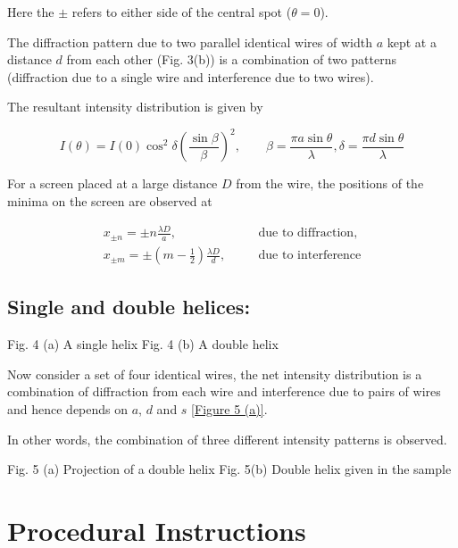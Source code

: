Here the $\pm$ refers to either side of the central spot ($\theta = 0$).

The diffraction pattern due to two parallel identical wires of width $a$ kept at a distance $d$ from each other (Fig. 3(b)) is a combination of two patterns (diffraction due to a single wire and interference due to two wires).

The resultant intensity distribution is given by   

\begin{equation}
    I(\theta) = I(0) \cos^2\delta \left( \frac{\sin \beta}{\beta} \right)^2, \quad \quad  \beta = \frac{\pi a \sin \theta}{\lambda}, \delta = \frac{\pi d \sin \theta}{\lambda}
\end{equation}

For a screen placed at a large distance $D$ from the wire, the positions of the minima on the screen are observed at 

\begin{equation*}
    \begin{aligned}
        x_{\pm n} = \pm n \frac{\lambda D}{a}, &\quad& \text{due to diffraction},\\
        x_{\pm m} = \pm \left( m - \frac{1}{2}\right) \frac{\lambda D}{d}, &\quad& \text{due to interference}
    \end{aligned}
\end{equation*}


\subsection*{Single and double helices:}
  
               
Fig. 4 (a) A single helix Fig. 4 (b) A double helix

Now consider a set of four identical wires, the net intensity distribution is a combination of diffraction from each wire and interference due to pairs of wires and hence depends on $a$, $d$ and $s$ \ref{Figure 5 (a)}.

In other words, the combination of three different intensity patterns is observed.

  

Fig. 5 (a) Projection of a double helix    Fig. 5(b) Double helix given in the sample


\section*{Procedural Instructions}

